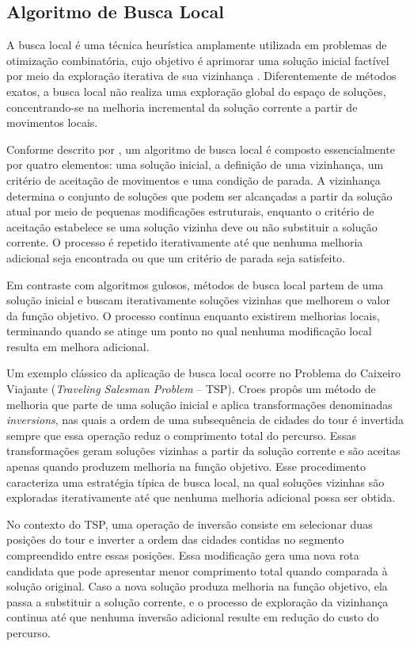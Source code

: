 \subsection{Algoritmo de Busca Local}

A busca local é uma técnica heurística amplamente utilizada em problemas de otimização combinatória, cujo objetivo é aprimorar 
uma solução inicial factível por meio da exploração iterativa de sua vizinhança \cite{Gendreau2010}. Diferentemente de métodos exatos, a busca local 
não realiza uma exploração global do espaço de soluções, concentrando-se na melhoria incremental da solução corrente a partir de movimentos locais.

Conforme descrito por \cite{Gendreau2010}, um algoritmo de busca local é composto essencialmente por quatro elementos: uma solução inicial, 
a definição de uma vizinhança, um critério de aceitação de movimentos e uma condição de parada. A vizinhança determina o conjunto de soluções que 
podem ser alcançadas a partir da solução atual por meio de pequenas modificações estruturais, enquanto o critério de aceitação estabelece 
se uma solução vizinha deve ou não substituir a solução corrente. O processo é repetido iterativamente até que nenhuma melhoria adicional 
seja encontrada ou que um critério de parada seja satisfeito.

Em contraste com algoritmos gulosos, métodos de busca local partem de uma solução inicial e buscam iterativamente soluções vizinhas que melhorem o valor da 
função objetivo. O processo continua enquanto existirem melhorias locais, terminando quando se atinge um ponto no qual nenhuma modificação local 
resulta em melhora adicional.

Um exemplo clássico da aplicação de busca local ocorre no Problema do Caixeiro Viajante (\textit{Traveling Salesman Problem} -- TSP). 
Croes \cite{Croes1958} propôs um método de melhoria que parte de uma solução inicial e aplica transformações denominadas 
\textit{inversions}, nas quais a ordem de uma subsequência de cidades do tour é invertida sempre que essa operação reduz o comprimento total do percurso. 
Essas transformações geram soluções vizinhas a partir da solução corrente e são aceitas apenas quando produzem melhoria na função objetivo. 
Esse procedimento caracteriza uma estratégia típica de busca local, na qual soluções vizinhas são exploradas iterativamente até que 
nenhuma melhoria adicional possa ser obtida.

No contexto do TSP, uma operação de inversão consiste em selecionar duas posições do tour e inverter a ordem das cidades contidas no 
segmento compreendido entre essas posições. Essa modificação gera uma nova rota candidata que pode apresentar menor comprimento total 
quando comparada à solução original. Caso a nova solução produza melhoria na função objetivo, ela passa a substituir a solução corrente, 
e o processo de exploração da vizinhança continua até que nenhuma inversão adicional resulte em redução do custo do percurso.

